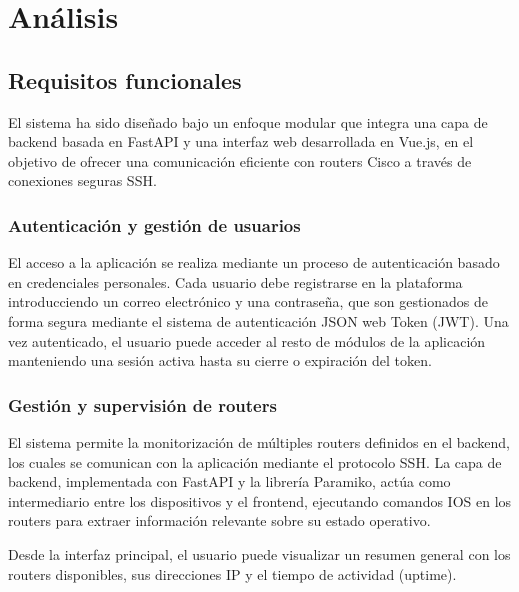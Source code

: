 
\chapter{Análisis}

\section{Requisitos funcionales}

El sistema ha sido diseñado bajo un enfoque modular que integra una capa de backend basada en FastAPI y una interfaz web desarrollada en Vue.js, en el objetivo de ofrecer una comunicación eficiente con routers Cisco a través de conexiones seguras SSH.

\subsection*{Autenticación y gestión de usuarios}

El acceso a la aplicación se realiza mediante un proceso de autenticación basado en credenciales personales. Cada usuario debe registrarse en la plataforma introducciendo un correo electrónico y una contraseña, que son gestionados de forma segura mediante el sistema de autenticación JSON web Token (JWT).
Una vez autenticado, el usuario puede acceder al resto de módulos de la aplicación manteniendo una sesión activa hasta su cierre o expiración del token.

\subsection*{Gestión y supervisión de routers}

El sistema permite la monitorización de múltiples routers definidos en el backend, los cuales se comunican con la aplicación mediante el protocolo SSH. La capa de backend, implementada con FastAPI y la librería Paramiko, actúa como intermediario entre los dispositivos y el frontend, ejecutando comandos IOS en los routers para extraer información relevante sobre su estado operativo.

Desde la interfaz principal, el usuario puede visualizar un resumen general con los routers disponibles, sus direcciones IP y el tiempo de actividad (uptime).

